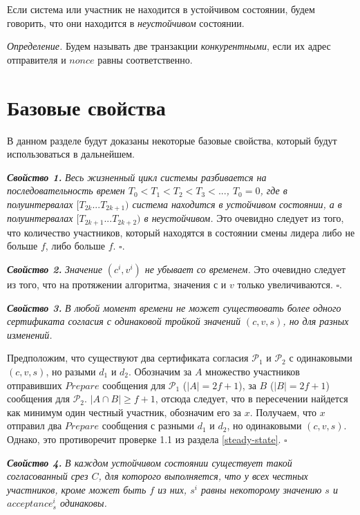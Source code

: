 Если система или участник не находится в устойчивом состоянии, будем говорить, что они находится в \textit{неустойчивом} состоянии.

\textit{Определение.} Будем называть две транзакции \textit{конкурентными}, если их адрес отправителя и $nonce$ равны соответственно.

\section{Базовые свойства}
В данном разделе будут доказаны некоторые базовые свойства, который будут использоваться в дальнейшем.

\textbf{\textit{Свойство 1.}} \textit{Весь жизненный цикл системы разбивается на последовательность времен
$T_0 < T_1 < T_2 < T_3 < ...$, $T_0=0$, где в полуинтервалах $[T_{2k}...T_{2k+1})$ система находится в устойчивом состоянии, а в полуинтервалах $[T_{2k+1}...T_{2k+2})$ в неустойчивом.}
Это очевидно следует из того, что количество участников, который находятся в состоянии смены лидера либо не больше $f$, либо больше $f$. $\square$.
\vspace{10pt}

\textbf{\textit{Свойство 2.}} \textit{Значение $(c^i, v^i)$ не убывает со временем.}
Это очевидно следует из того, что на протяжении алгоритма, значения $с$ и $v$ только увеличиваются. $\square$.
\vspace{10pt}

\textbf{\textit{Свойство 3.}} \textit{В любой момент времени не может существовать более одного сертификата согласия с одинаковой тройкой значений $(c, v, s)$, но для разных изменений.} 

Предположим, что существуют два сертификата согласия $\mathcal{P}_1$ и $\mathcal{P}_2$ с одинаковыми $(c, v, s)$, но разыми $d_1$ и $d_2$. 
Обозначим за $A$ множество участников отправивших $Prepare$ сообщения для  $\mathcal{P}_1$ ($|A|=2f+1$), за $B$ ($|B|=2f+1$) сообщения для $\mathcal{P}_2$. $|A \cap B| \ge f+1$, отсюда следует, что в пересечении найдется как минимум один честный участник, обозначим его за $x$. Получаем, что $x$ отправил два $Prepare$ сообщения с разными $d_1$ и $d_2$, но одинаковыми $(c, v, s)$. Однако, это противоречит проверке 1.1 из раздела \ref{steady-state}. $\square$
\vspace{10pt}

\textbf{\textit{Свойство 4.}} \textit{В каждом устойчивом состоянии существует такой согласованный срез $C$, для которого выполняется, что у всех честных участников, кроме может быть $f$ из них, $s^i$ равны некоторому значению $s$ и $acceptance^i_s$ одинаковы.}

